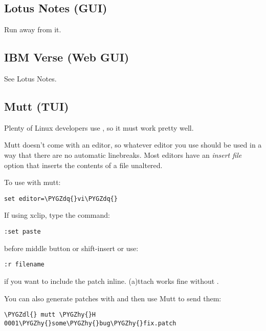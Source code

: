 \documentclass[a4paper,8pt,english]{sphinxmanual}
\def\PYGZdl{\char`\$}
\def\PYGZhy{\char`\-}
\def\PYGZdq{\char`\"}
\begin{document}
\subsection{Lotus Notes (GUI)}
\label{process/email-clients:lotus-notes-gui}
Run away from it.


\subsection{IBM Verse (Web GUI)}
\label{process/email-clients:ibm-verse-web-gui}
See Lotus Notes.


\subsection{Mutt (TUI)}
\label{process/email-clients:mutt-tui}
Plenty of Linux developers use , so it must work pretty well.

Mutt doesn't come with an editor, so whatever editor you use should be
used in a way that there are no automatic linebreaks.  Most editors have
an \emph{insert file} option that inserts the contents of a file
unaltered.

To use  with mutt:

\begin{Verbatim}[commandchars=\\\{\}]
set editor=\PYGZdq{}vi\PYGZdq{}
\end{Verbatim}

If using xclip, type the command:

\begin{Verbatim}[commandchars=\\\{\}]
:set paste
\end{Verbatim}

before middle button or shift-insert or use:

\begin{Verbatim}[commandchars=\\\{\}]
:r filename
\end{Verbatim}

if you want to include the patch inline.
(a)ttach works fine without .

You can also generate patches with  and then use Mutt
to send them:

\begin{Verbatim}[commandchars=\\\{\}]
\PYGZdl{} mutt \PYGZhy{}H 0001\PYGZhy{}some\PYGZhy{}bug\PYGZhy{}fix.patch
\end{Verbatim}
\end{document}
